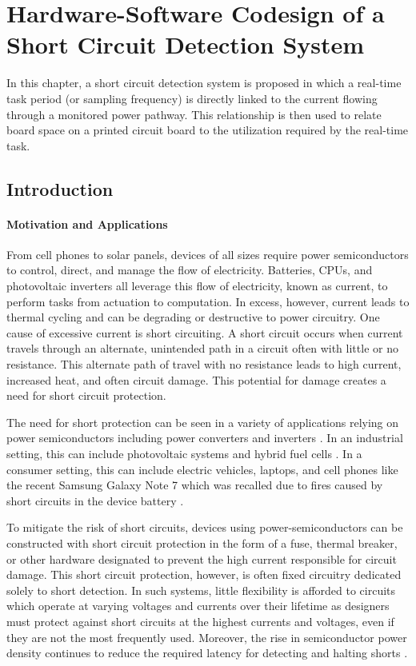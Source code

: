 \section{Hardware-Software Codesign of a Short Circuit Detection System}   \label{chap:scd}

In this chapter, a short circuit detection system is proposed in which a real-time task period (or sampling frequency) is directly linked to the current flowing through a monitored power pathway.
This relationship is then used to relate board space on a printed circuit board to the utilization required by the real-time task.

\subsection{Introduction}   \label{subsec:hardwareSoftwarreCodesign}

\paragraph{Motivation and Applications}
From cell phones to solar panels, devices of all sizes require power semiconductors to control, direct, and manage the flow of electricity.
Batteries, CPUs, and photovoltaic inverters all leverage this flow of electricity, known as current, to perform tasks from actuation to computation.
In excess, however, current leads to thermal cycling and can be degrading or destructive to power circuitry.
One cause of excessive current is short circuiting.
A short circuit occurs when current travels through an alternate, unintended path in a circuit often with little or no resistance.
This alternate path of travel with no resistance leads to high current, increased heat, and often circuit damage.
This potential for damage creates a need for short circuit protection.

The need for short protection can be seen in a variety of applications relying on power semiconductors including power converters and inverters \cite{horiguchi_high-speed_2015}.
In an industrial setting, this can include photovoltaic systems and hybrid fuel cells \cite{zhang_model-based_2011}.
In a consumer setting, this can include electric vehicles, laptops, and cell phones like the recent Samsung Galaxy Note 7 which was recalled due to fires caused by short circuits in the device battery \cite{hollister_heres_2016}.

To mitigate the risk of short circuits, devices using power-semiconductors can be constructed with short circuit protection in the form of a fuse, thermal breaker, or other hardware designated to prevent the high current responsible for circuit damage.
This short circuit protection, however, is often fixed circuitry dedicated solely to short detection.
In such systems, little flexibility is afforded to circuits which operate at varying voltages and currents over their lifetime as designers must protect against short circuits at the highest currents and voltages, even if they are not the most frequently used.
Moreover, the rise in semiconductor power density continues to reduce the required latency for detecting and halting shorts \cite{horiguchi_short_2014}.

